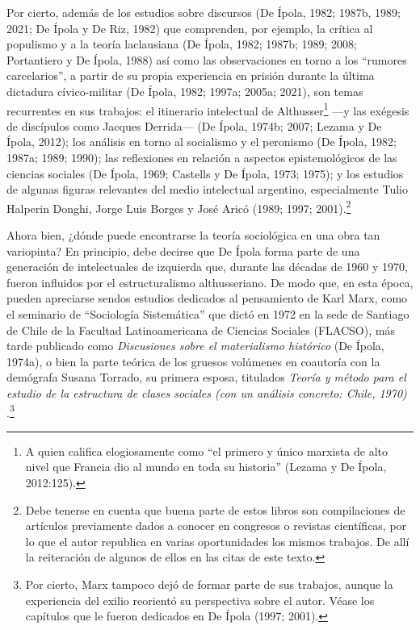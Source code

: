 Por cierto, además de los estudios sobre discursos (De Ípola, 1982; 1987b, 1989; 2021; De Ípola y De Riz, 1982) que comprenden, por ejemplo, la crítica al populismo y a la teoría laclausiana (De Ípola, 1982; 1987b; 1989; 2008; Portantiero y De Ípola, 1988) así como las observaciones en torno a los ``rumores carcelarios'', a partir de su propia experiencia en prisión durante la última dictadura cívico-militar (De Ípola, 1982; 1997a; 2005a; 2021), son temas recurrentes en sus trabajos: el itinerario intelectual de Althusser\footnote{A quien califica elogiosamente como ``el primero y único marxista de alto nivel que Francia dio al mundo en toda su historia'' (Lezama y De Ípola, 2012:125).} ---y las exégesis de discípulos como Jacques Derrida--- (De Ípola, 1974b; 2007; Lezama y De Ípola, 2012); los análisis en torno al socialismo y el peronismo (De Ípola, 1982; 1987a; 1989; 1990); las reflexiones en relación a aspectos epistemológicos de las ciencias sociales (De Ípola, 1969; Castells y De Ípola, 1973; 1975); y los estudios de algunas figuras relevantes del medio intelectual argentino, especialmente Tulio Halperin Donghi, Jorge Luis Borges y José Aricó (1989; 1997; 2001).\footnote{Debe tenerse en cuenta que buena parte de estos libros son compilaciones de artículos previamente dados a conocer en congresos o revistas científicas, por lo que el autor republica en varias oportunidades los mismos trabajos. De allí la reiteración de algunos de ellos en las citas de este texto.}

Ahora bien, ¿dónde puede encontrarse la teoría sociológica en una obra tan variopinta? En principio, debe decirse que De Ípola forma parte de una generación de intelectuales de izquierda que, durante las décadas de 1960 y 1970, fueron influidos por el estructuralismo althusseriano. De modo que, en esta época, pueden apreciarse sendos estudios dedicados al pensamiento de Karl Marx, como el seminario de ``Sociología Sistemática'' que dictó en 1972 en la sede de Santiago de Chile de la Facultad Latinoamericana de Ciencias Sociales (FLACSO), más tarde publicado como \emph{Discusiones sobre el materialismo histórico} (De Ípola, 1974a), o bien la parte teórica de los gruesos volúmenes en coautoría con la demógrafa Susana Torrado, su primera esposa, titulados \emph{Teoría y método para el estudio de la estructura de clases sociales (con un análisis concreto: Chile, 1970)} \parencite{1505-TORRADO1976}.\footnote{Por cierto, Marx tampoco dejó de formar parte de sus trabajos, aunque la experiencia del exilio reorientó su perspectiva sobre el autor. Véase los capítulos que le fueron dedicados en De Ípola (1997; 2001).}

